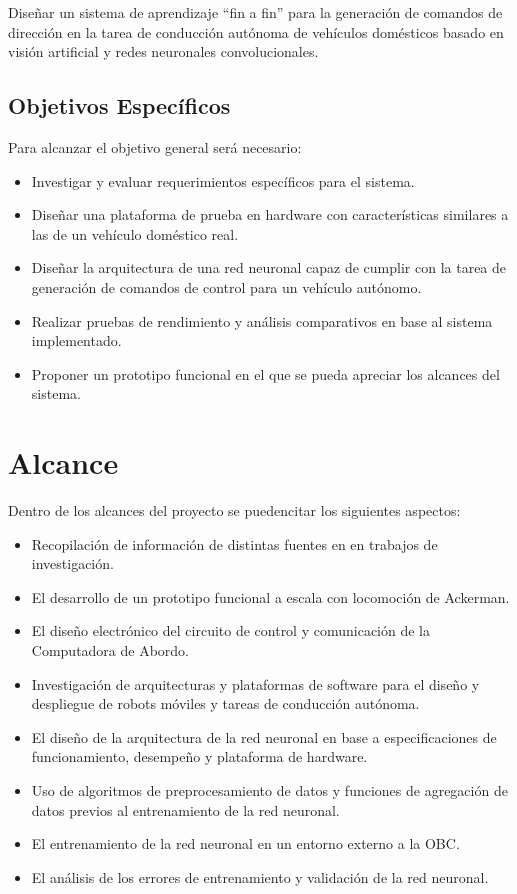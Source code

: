 \documentclass[12pt,letterpaper]{article}
\begin{document}
Diseñar un sistema de aprendizaje “fin a fin” para la generación de comandos de 
dirección en la tarea de conducción autónoma de vehículos domésticos basado en 
visión artificial y redes neuronales convolucionales.

\subsection{Objetivos Específicos}
Para alcanzar el objetivo general será necesario:

\begin{itemize}
    \item Investigar y evaluar requerimientos específicos para el sistema.
    \item Diseñar una plataforma de prueba en hardware con características similares a las de un vehículo doméstico real.
    \item Diseñar la arquitectura de una red neuronal capaz de cumplir con la tarea de generación de comandos 
    de control para un vehículo autónomo.
    \item Realizar pruebas de rendimiento y análisis comparativos en base al sistema implementado.
    \item Proponer un prototipo funcional en el que se pueda apreciar los alcances del sistema.
\end{itemize}


\section{Alcance}

Dentro de los alcances del proyecto se puedencitar los siguientes
aspectos:

\begin{itemize}
    \item Recopilación de información de distintas fuentes en 
    en trabajos de investigación.
    \item El desarrollo de un prototipo funcional a escala con 
    locomoción de Ackerman.
    \item El diseño electrónico del circuito de control y comunicación de
    la Computadora de Abordo.
    \item Investigación de arquitecturas y plataformas de software para el
    diseño y despliegue de robots móviles y tareas de conducción autónoma.
    \item El diseño de la arquitectura de la red neuronal en base a 
    especificaciones de funcionamiento, desempeño y plataforma de hardware.
    \item Uso de algoritmos de preprocesamiento de datos y funciones
    de agregación de datos previos al entrenamiento de la red neuronal.
    \item El entrenamiento de la red neuronal en un entorno externo a la OBC.
    \item El análisis de los errores de entrenamiento y validación de la red neuronal.

\end{itemize}
\end{document}
